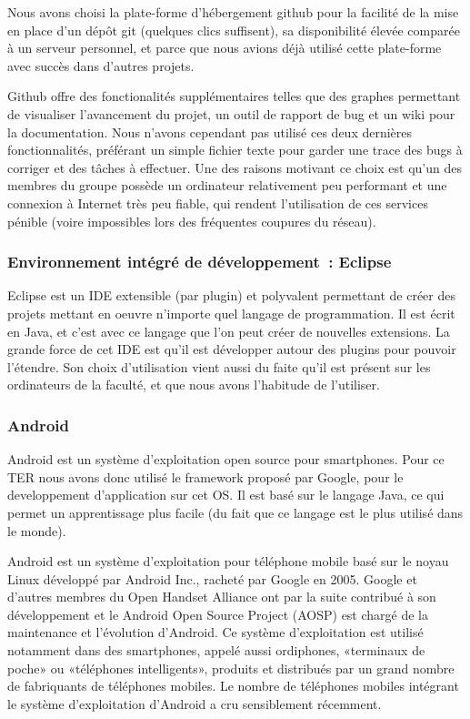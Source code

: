 \documentclass[a4paper,11pt,french]{article}
\def\android{Android\texttrademark{}}
\begin{document}
Nous avons choisi la plate-forme d'hébergement github pour la facilité de la mise en place d'un dépôt git (quelques clics suffisent), sa disponibilité élevée comparée à un serveur personnel, et parce que nous avions déjà utilisé cette plate-forme avec succès dans d'autres projets.

Github offre des fonctionalités supplémentaires telles que des graphes permettant de visualiser l'avancement du projet, un outil de rapport de bug et un wiki pour la documentation. Nous n'avons cependant pas utilisé ces deux dernières fonctionnalités, préférant un simple fichier texte pour garder une trace des bugs à corriger et des tâches à effectuer. Une des raisons motivant ce choix est qu'un des membres du groupe possède un ordinateur relativement peu performant et une connexion à Internet très peu fiable, qui rendent l'utilisation de ces services pénible (voire impossibles lors des fréquentes coupures du réseau).

\subsubsection{Environnement intégré de développement~: Eclipse}
Eclipse est un IDE extensible (par plugin) et polyvalent permettant de créer des projets mettant en oeuvre n'importe quel langage de programmation. Il est écrit en Java, et c'est avec ce langage que l'on peut créer de nouvelles extensions. La grande force de cet IDE est qu'il est développer autour des plugins pour pouvoir l'étendre.
Son choix d'utilisation vient aussi du faite qu'il est présent sur les ordinateurs de la faculté, et que nous avons l'habitude de l'utiliser.

\subsubsection{\android{}}
\android{} est un système d'exploitation open source pour smartphones. Pour ce TER nous avons donc utilisé le framework proposé par Google, pour le developpement d'application sur cet OS. Il est basé sur le langage Java, ce qui permet un apprentissage plus facile (du fait que ce langage est le plus utilisé dans le monde).

\android{} est un système d'exploitation pour téléphone mobile basé sur le noyau Linux développé par \android{} Inc., racheté par Google en 2005. Google et d'autres membres du Open Handset Alliance ont par la suite contribué à son développement et le \android{} Open Source Project (AOSP) est chargé de la maintenance et l'évolution d'\android{}. Ce système d'exploitation est utilisé notamment dans des smartphones, appelé aussi ordiphones, «terminaux de poche» ou «téléphones intelligents», produits et distribués par un grand nombre de fabriquants de téléphones mobiles. Le nombre de téléphones mobiles intégrant le système d'exploitation d'\android{} a cru sensiblement récemment.
\end{document}
